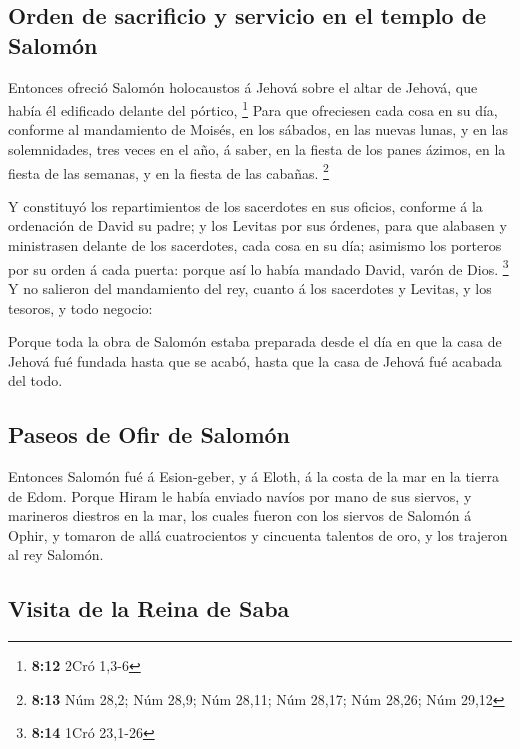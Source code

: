 \hypertarget{orden-de-sacrificio-y-servicio-en-el-templo-de-salomuxf3n}{%
\subsection{Orden de sacrificio y servicio en el templo de
Salomón}\label{orden-de-sacrificio-y-servicio-en-el-templo-de-salomuxf3n}}

 Entonces ofreció Salomón holocaustos á Jehová sobre el
altar de Jehová, que había él edificado delante del pórtico, \footnote{\textbf{8:12}
  2Cró 1,3-6}  Para que ofreciesen cada cosa en su día,
conforme al mandamiento de Moisés, en los sábados, en las nuevas lunas,
y en las solemnidades, tres veces en el año, á saber, en la fiesta de
los panes ázimos, en la fiesta de las semanas, y en la fiesta de las
cabañas. \footnote{\textbf{8:13} Núm 28,2; Núm 28,9; Núm 28,11; Núm
  28,17; Núm 28,26; Núm 29,12}

 Y constituyó los repartimientos de los sacerdotes en sus
oficios, conforme á la ordenación de David su padre; y los Levitas por
sus órdenes, para que alabasen y ministrasen delante de los sacerdotes,
cada cosa en su día; asimismo los porteros por su orden á cada puerta:
porque así lo había mandado David, varón de Dios. \footnote{\textbf{8:14}
  1Cró 23,1-26}  Y no salieron del mandamiento del rey,
cuanto á los sacerdotes y Levitas, y los tesoros, y todo negocio:

 Porque toda la obra de Salomón estaba preparada desde el
día en que la casa de Jehová fué fundada hasta que se acabó, hasta que
la casa de Jehová fué acabada del todo.

\hypertarget{paseos-de-ofir-de-salomuxf3n}{%
\subsection{Paseos de Ofir de
Salomón}\label{paseos-de-ofir-de-salomuxf3n}}

 Entonces Salomón fué á Esion-geber, y á Eloth, á la
costa de la mar en la tierra de Edom.  Porque Hiram le
había enviado navíos por mano de sus siervos, y marineros diestros en la
mar, los cuales fueron con los siervos de Salomón á Ophir, y tomaron de
allá cuatrocientos y cincuenta talentos de oro, y los trajeron al rey
Salomón.

\hypertarget{visita-de-la-reina-de-saba}{%
\subsection{Visita de la Reina de
Saba}\label{visita-de-la-reina-de-saba}}

